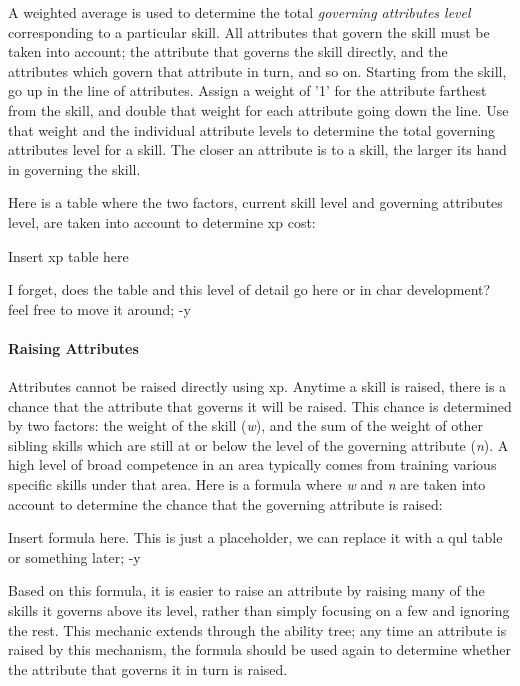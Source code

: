 \documentclass[12pt]{article}
\newcommand{\notes}[1]{{\color{Tan} #1}}
\begin{document}
A weighted average is used to determine the total \emph{governing attributes level} corresponding to a particular skill. All attributes that govern the skill must be taken into account; the attribute that governs the skill directly, and the attributes which govern that attribute in turn, and so on. Starting from the skill, go up in the line of attributes. Assign a weight of '1' for the attribute farthest from the skill, and double that weight for each attribute going down the line. Use that weight and the individual attribute levels to determine the total governing attributes level for a skill. The closer an attribute is to a skill, the larger its hand in governing the skill. 

Here is a table where the two factors, current skill level and governing attributes level, are taken into account to determine xp cost:

\notes{Insert xp table here}

\notes{I forget, does the table and this level of detail go here or in char development? feel free to move it around; -y}

\paragraph{Raising Attributes} Attributes cannot be raised directly using xp. Anytime a skill is raised, there is a chance that the attribute that governs it will be raised. This chance is determined by two factors: the weight of the skill (\emph{w}), and the sum of the weight of other sibling skills which are still at or below the level of the governing attribute (\emph{n}). A high level of broad competence in an area typically comes from training various specific skills under that area. Here is a formula where \emph{w} and \emph{n} are taken into account to determine the chance that the governing attribute is raised:

\notes{Insert formula here. This is just a placeholder, we can replace it with a qul table or something later; -y}

Based on this formula, it is easier to raise an attribute by raising many of the skills it governs above its level, rather than simply focusing on a few and ignoring the rest. This mechanic extends through the ability tree; any time an attribute is raised by this mechanism, the formula should be used again to determine whether the attribute that governs it in turn is raised.
\end{document}
